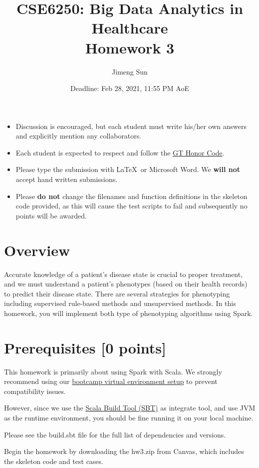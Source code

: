\documentclass[12pt]{article}
\title{CSE6250: Big Data Analytics in Healthcare \\ Homework 3}
\author{Jimeng Sun}
\date{Deadline: Feb 28, 2021, 11:55 PM AoE}
\begin{document}
\maketitle
\begin{itemize}
\item Discussion is encouraged, but each student must write his/her own answers and explicitly mention any collaborators.
\item Each student is expected to respect and follow the \href{http://osi.gatech.edu/content/honor-code}{ GT Honor Code}.
\item Please type the submission with \LaTeX\ or Microsoft Word. We \textbf{will not} accept hand written submissions.
\item Please \textbf{do not} change the filenames and function definitions in the skeleton code provided, as this will cause the test scripts to fail and subsequently no points will be awarded. 
\end{itemize}


\section*{Overview}
Accurate knowledge of a patient's disease state is crucial to proper treatment, and we must understand a patient's phenotypes (based on their health records) to predict their disease state. There are several strategies for phenotyping including supervised rule-based methods and unsupervised methods. In this homework, you will implement both type of phenotyping algorithms using Spark.

\section*{Prerequisites [0 points]}
This homework is primarily about using Spark with Scala. We strongly recommend using our \href{http://www.sunlab.org/teaching/cse6250/fall2018/env}{bootcamp virtual environment setup} to prevent compatibility issues.

However, since we use the \href{http://www.scala-sbt.org/}{Scala Build Tool (SBT)} as integrate tool, and use JVM as the runtime environment, you should be fine running it on your local machine.

Please see the build.sbt file for the full list of dependencies and versions.

Begin the homework by downloading the hw3.zip from Canvas, which includes the skeleton code and test cases. 
\end{document}
